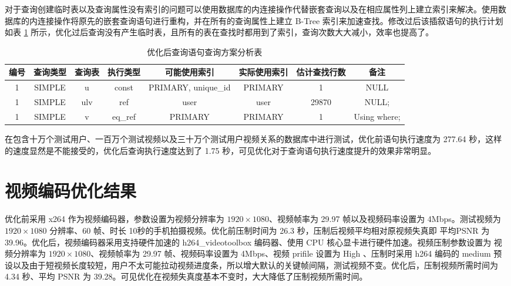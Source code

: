 对于查询创建临时表以及查询属性没有索引的问题可以使用数据库的内连接操作代替嵌套查询以及在相应属性列上建立索引来解决。使用数据库的内连接操作将原先的嵌套查询语句进行重构，并在所有的查询属性上建立 B-Tree 索引来加速查找。修改过后该插叙语句的执行计划如表 \ref{tab:af_explain} 所示，优化过后查询没有产生临时表，且所有的表在查找时都用到了索引，查询次数大大减小，效率也提高了。

\begin{table}[!ht]
    \centering
    \caption{优化后查询语句查询方案分析表}
	\label{tab:af_explain}
	\footnotesize
    \begin{tabularx}{\textwidth}{cccccccc}
    \toprule
    编号 & 查询类型 & 查询表 & 执行类型 & 可能使用索引 & 实际使用索引 & 估计查找行数 & 备注  \\ \midrule
    1 & SIMPLE & u & const & PRIMARY, unique\_id & PRIMARY & 1 & NULL \\
    1 & SIMPLE & ulv & ref & user & user & 29870 & NULL; \\ 
    1 & SIMPLE & v & eq\_ref & PRIMARY & PRIMARY & 1 & Using where; \\ \bottomrule
    \end{tabularx}
\end{table}


在包含十万个测试用户、一百万个测试视频以及三十万个测试用户视频关系的数据库中进行测试，优化前语句执行速度为 277.64 秒，这样的速度显然是不能接受的，优化后查询执行速度达到了 1.75 秒，可见优化对于查询语句执行速度提升的效果非常明显。


\section{视频编码优化结果}
优化前采用 x264 作为视频编码器，参数设置为视频分辨率为 $1920\times1080$、视频帧率为 29.97 帧以及视频码率设置为 4Mbps。测试视频为 $1920\times1080$ 分辨率、60 帧、时长 10秒的手机拍摄视频。优化前压制时间为 26.3 秒，压制后视频平均相对原视频失真即 平均PSNR 为 39.96。优化后，视频编码器采用支持硬件加速的 h264\_videotoolbox 编码器、使用 CPU 核心显卡进行硬件加速。视频压制参数设置为 视频分辨率为 $1920\times1080$、视频帧率为 29.97 帧、视频码率设置为 4Mbps、视频 prifile 设置为 High 、压制时采用 h264 编码的 medium 预设以及由于短视频长度较短，用户不太可能拉动视频进度条，所以增大默认的关键帧间隔，测试视频不变。优化后，压制视频所需时间为 4.34 秒、平均 PSNR 为 39.28。可见优化在视频失真度基本不变时，大大降低了压制视频所需时间。
